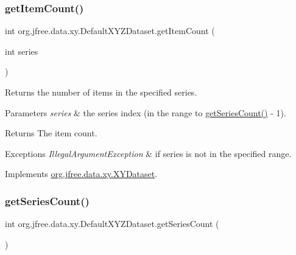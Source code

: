 \subsubsection{\texorpdfstring{get\+Item\+Count()}{getItemCount()}}
{\footnotesize\ttfamily int org.\+jfree.\+data.\+xy.\+Default\+X\+Y\+Z\+Dataset.\+get\+Item\+Count (\begin{DoxyParamCaption}\item[{int}]{series }\end{DoxyParamCaption})}

Returns the number of items in the specified series.


\begin{DoxyParams}{Parameters}
{\em series} & the series index (in the range {} to {\ttfamily \mbox{\hyperlink{classorg_1_1jfree_1_1data_1_1xy_1_1_default_x_y_z_dataset_a115138a06afdc19d3526ef73fabf578e}{get\+Series\+Count()}} -\/ 1}).\\
\hline
\end{DoxyParams}
\begin{DoxyReturn}{Returns}
The item count.
\end{DoxyReturn}

\begin{DoxyExceptions}{Exceptions}
{\em Illegal\+Argument\+Exception} & if {\ttfamily series} is not in the specified range. \\
\hline
\end{DoxyExceptions}


Implements \mbox{\hyperlink{interfaceorg_1_1jfree_1_1data_1_1xy_1_1_x_y_dataset_ae81f9de91dfcae45028fc8a486a119da}{org.\+jfree.\+data.\+xy.\+X\+Y\+Dataset}}.

\mbox{\label{classorg_1_1jfree_1_1data_1_1xy_1_1_default_x_y_z_dataset_a115138a06afdc19d3526ef73fabf578e}} 
\subsubsection{\texorpdfstring{get\+Series\+Count()}{getSeriesCount()}}
{\footnotesize\ttfamily int org.\+jfree.\+data.\+xy.\+Default\+X\+Y\+Z\+Dataset.\+get\+Series\+Count (\begin{DoxyParamCaption}{ }\end{DoxyParamCaption})}

